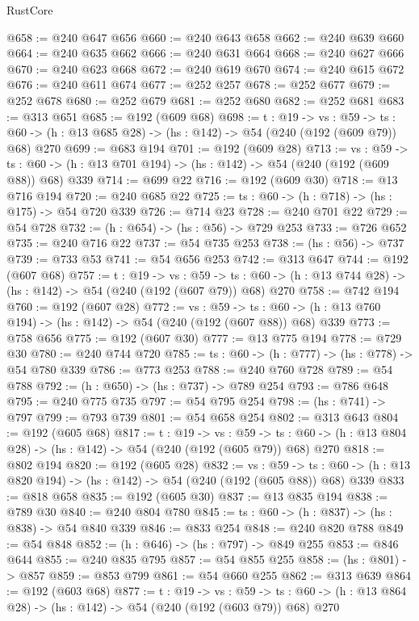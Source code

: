 \begin{lexlean}{RustCore}
\begin{coremodule}
@658 := @240 @647 @656
@660 := @240 @643 @658
@662 := @240 @639 @660
@664 := @240 @635 @662
@666 := @240 @631 @664
@668 := @240 @627 @666
@670 := @240 @623 @668
@672 := @240 @619 @670
@674 := @240 @615 @672
@676 := @240 @611 @674
@677 := @252 @257
@678 := @252 @677
@679 := @252 @678
@680 := @252 @679
@681 := @252 @680
@682 := @252 @681
@683 := @313 @651
@685 := @192 (@609 @68)
@698 := {t : @19} ->
  {vs : @59} ->
  {ts : @60} -> (h : @13 @685 @28) -> (hs : @142) -> @54 (@240 (@192 (@609 @79)) @68) @270
@699 := @683 @194
@701 := @192 (@609 @28)
@713 := {vs : @59} ->
  {ts : @60} -> (h : @13 @701 @194) -> (hs : @142) -> @54 (@240 (@192 (@609 @88)) @68) @339
@714 := @699 @22
@716 := @192 (@609 @30)
@718 := @13 @716 @194
@720 := @240 @685 @22
@725 := {ts : @60} -> (h : @718) -> (hs : @175) -> @54 @720 @339
@726 := @714 @23
@728 := @240 @701 @22
@729 := @54 @728
@732 := (h : @654) -> (hs : @56) -> @729 @253
@733 := @726 @652
@735 := @240 @716 @22
@737 := @54 @735 @253
@738 := (hs : @56) -> @737
@739 := @733 @53
@741 := @54 @656 @253
@742 := @313 @647
@744 := @192 (@607 @68)
@757 := {t : @19} ->
  {vs : @59} ->
  {ts : @60} -> (h : @13 @744 @28) -> (hs : @142) -> @54 (@240 (@192 (@607 @79)) @68) @270
@758 := @742 @194
@760 := @192 (@607 @28)
@772 := {vs : @59} ->
  {ts : @60} -> (h : @13 @760 @194) -> (hs : @142) -> @54 (@240 (@192 (@607 @88)) @68) @339
@773 := @758 @656
@775 := @192 (@607 @30)
@777 := @13 @775 @194
@778 := @729 @30
@780 := @240 @744 @720
@785 := {ts : @60} -> (h : @777) -> (hs : @778) -> @54 @780 @339
@786 := @773 @253
@788 := @240 @760 @728
@789 := @54 @788
@792 := (h : @650) -> (hs : @737) -> @789 @254
@793 := @786 @648
@795 := @240 @775 @735
@797 := @54 @795 @254
@798 := (hs : @741) -> @797
@799 := @793 @739
@801 := @54 @658 @254
@802 := @313 @643
@804 := @192 (@605 @68)
@817 := {t : @19} ->
  {vs : @59} ->
  {ts : @60} -> (h : @13 @804 @28) -> (hs : @142) -> @54 (@240 (@192 (@605 @79)) @68) @270
@818 := @802 @194
@820 := @192 (@605 @28)
@832 := {vs : @59} ->
  {ts : @60} -> (h : @13 @820 @194) -> (hs : @142) -> @54 (@240 (@192 (@605 @88)) @68) @339
@833 := @818 @658
@835 := @192 (@605 @30)
@837 := @13 @835 @194
@838 := @789 @30
@840 := @240 @804 @780
@845 := {ts : @60} -> (h : @837) -> (hs : @838) -> @54 @840 @339
@846 := @833 @254
@848 := @240 @820 @788
@849 := @54 @848
@852 := (h : @646) -> (hs : @797) -> @849 @255
@853 := @846 @644
@855 := @240 @835 @795
@857 := @54 @855 @255
@858 := (hs : @801) -> @857
@859 := @853 @799
@861 := @54 @660 @255
@862 := @313 @639
@864 := @192 (@603 @68)
@877 := {t : @19} ->
  {vs : @59} ->
  {ts : @60} -> (h : @13 @864 @28) -> (hs : @142) -> @54 (@240 (@192 (@603 @79)) @68) @270

\end{coremodule}
\end{lexlean}
